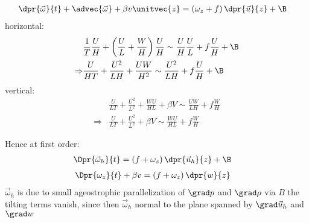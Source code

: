 \begin{derivation}[Vorticity]
	\begin{equation}\begin{split}
	\dpr{\vec{\omega} }{t}
	+
	\advec{\vec{\omega}}
	+
	\beta v \unitvec{z}
	&=
	\left(\omega_z +
	f\right) \dpr{ \vec{u}}{z}
	+
	\B
	\end{split}\end{equation}
	horizontal:
	\begin{equation}\begin{split}
	&\frac{1}{T} \frac{U}{H }
	+
	\left(\frac{U }{L} + \frac{W}{H} \right)
	\frac{U }{H}
	\sim
	\frac{U }{H} \frac{U}{L}
	+
	f \frac{U}{H}
	+
	\B \\
	\Rightarrow
	&\frac{U}{HT }
	+
	\frac{U^2 }{LH}
	+
	\frac{UW }{H^2}
	\sim
	\frac{U^2}{LH}
	+
	f \frac{U}{H}
	+
	\B
	\end{split}\end{equation}
	vertical:
	\begin{equation}\begin{split}
	&\frac{U}{LT}
	+
	\frac{U^2}{L^2}
	+
	\frac{W U}{ H L}
	+
	\beta V
	\sim
	\frac{UW}{LH}
	+
	f\frac{W}{H}
	\\
	\Rightarrow
	&\frac{U}{LT}
	+
	\frac{U^2}{L^2}
	+
	\beta V
	\sim
	\frac{WU}{HL}
	+
	f\frac{W}{H}
	\end{split}\end{equation}

	Hence at first order:
	\begin{equation}\begin{split}
	\Dpr{\vec{\omega}_h }{t}
	&=
	\left(f + \omega_z \right)\dpr{\vec{u}_h}{z}
	+
	\B
	\end{split}\end{equation}
	\begin{equation}\begin{split}
	\Dpr{\omega_z }{t}
	+
	\beta v
	&=
	\left(f + \omega_z \right)\dpr{w}{z}
	\end{split}\end{equation}
	$\vec{\omega}_h$ is due to small ageostrophic parallelization of $\grad p$
	and	$\grad \rho$  via $B$ the tilting terms vanish, since then
	$\vec{\omega}_h$	normal to the plane spanned by $\grad \vec{u}_h$ and
	$\grad	w$
\end{derivation}


